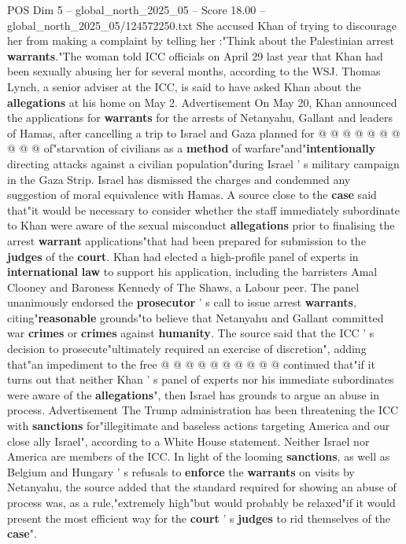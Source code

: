 \begin{textsample}{POS Dim 5 – global\_north\_2025\_05 – Score 18.00 – global\_north\_2025\_05/124572250.txt}
She accused Khan of trying to discourage her from making a complaint by telling her :"Think about the Palestinian arrest \textbf{warrants}."The woman told ICC officials on April 29 last year that Khan had been sexually abusing her for several months, according to the WSJ.
Thomas Lynch, a senior adviser at the ICC, is said to have asked Khan about the \textbf{allegations} at his home on May 2.
Advertisement On May 20, Khan announced the applications for \textbf{warrants} for the arrests of Netanyahu, Gallant and leaders of Hamas, after cancelling a trip to Israel and Gaza planned for @ @ @ @ @ @ @ @ @ @ of"starvation of civilians as a \textbf{method} of warfare"and"\textbf{intentionally} directing attacks against a civilian population"during Israel ' s military campaign in the Gaza Strip.
Israel has dismissed the charges and condemned any suggestion of moral equivalence with Hamas.
A source close to the \textbf{case} said that"it would be necessary to consider whether the staff immediately subordinate to Khan were aware of the sexual misconduct \textbf{allegations} prior to finalising the arrest \textbf{warrant} applications"that had been prepared for submission to the \textbf{judges} of the \textbf{court}.
Khan had elected a high-profile panel of experts in \textbf{international} \textbf{law} to support his application, including the barristers Amal Clooney and Baroness Kennedy of The Shaws, a Labour peer.
The panel unanimously endorsed the \textbf{prosecutor} ' s call to issue arrest \textbf{warrants}, citing"\textbf{reasonable} grounds"to believe that Netanyahu and Gallant committed war \textbf{crimes} or \textbf{crimes} against \textbf{humanity}.
The source said that the ICC ' s decision to prosecute"ultimately required an exercise of discretion", adding that"an impediment to the free @ @ @ @ @ @ @ @ @ @ continued that"if it turns out that neither Khan ' s panel of experts nor his immediate subordinates were aware of the \textbf{allegations}", then Israel has grounds to argue an abuse in process.
Advertisement The Trump administration has been threatening the ICC with \textbf{sanctions} for"illegitimate and baseless actions targeting America and our close ally Israel", according to a White House statement.
Neither Israel nor America are members of the ICC.
In light of the looming \textbf{sanctions}, as well as Belgium and Hungary ' s refusals to \textbf{enforce} the \textbf{warrants} on visits by Netanyahu, the source added that the standard required for showing an abuse of process was, as a rule,"extremely high"but would probably be relaxed"if it would present the most efficient way for the \textbf{court} ' s \textbf{judges} to rid themselves of the \textbf{case}".

\end{textsample}
